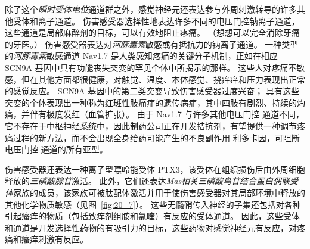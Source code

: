除了这个\textit{瞬时受体电位}通道群之外，感觉神经元还表达参与外周刺激转导的许多其他受体和离子通道。
伤害感受器选择性地表达许多不同的电压门控钠离子通道，这些通道是局部麻醉剂的目标，可以有效地阻止疼痛。
（想想可以完全消除牙痛的牙医。）
伤害感受器表达对\textit{河豚毒素}敏感或有抵抗力的钠离子通道。
一种类型的\textit{河豚毒素}敏感通道 Nav1.7 是人类感知疼痛的关键分子机制，正如在相应 SCN9A 基因中具有功能丧失突变的罕见个体中所揭示的那样。
这些人对疼痛不敏感，但在其他方面都很健康，对触觉、温度、本体感觉、挠痒痒和压力表现出正常的感觉反应。 
SCN9A 基因中的第二类突变导致伤害感受器过度兴奋； 具有这些突变的个体表现出一种称为红斑性肢痛症的遗传病症，其中四肢有剧烈、持续的灼痛，并伴有极度发红（血管扩张）。
由于 Nav1.7 与许多其他电压门控  通道不同，它不存在于中枢神经系统中，因此制药公司正在开发拮抗剂，有望提供一种调节疼痛过程的新方法，而不会出现全身给药可能产生的不良副作用 利多卡因，可阻断电压门控  通道的所有亚型。


伤害感受器还表达一种离子型嘌呤能受体 PTX3，该受体在组织损伤后由外周细胞释放的\textit{三磷酸腺苷}激活。
此外，它们还表达\textit{Mas相关三磷酸鸟苷结合蛋白偶联受体}家族的成员，该家族可被肽配体激活并用于使伤害感受器对其局部环境中释放的其他化学物质敏感（见图~\ref{fig:20_7}）。
这些无髓鞘传入神经的子集还包括对各种引起瘙痒的物质（包括致痒剂组胺和氯喹）有反应的受体通道。
因此，这些受体和通道是开发选择性药物的有吸引力的目标，这些药物对感觉神经元有反应，对疼痛和瘙痒刺激有反应。


